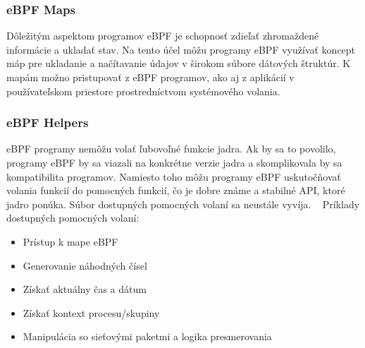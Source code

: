 \subsubsection{eBPF Maps}
Dôležitým aspektom programov eBPF je schopnosť zdieľať zhromaždené informácie a ukladať stav. 
Na tento účel môžu programy eBPF využívať koncept máp pre ukladanie a načítavanie údajov v širokom súbore dátových štruktúr.
K mapám možno pristupovať z eBPF programov, ako aj z aplikácií v používateľskom priestore prostredníctvom systémového volania.~\cite{eBPF, book1}

\subsubsection{eBPF Helpers}
eBPF programy nemôžu volať ľubovoľné funkcie jadra. Ak by sa to povolilo, programy eBPF by sa viazali na konkrétne verzie jadra 
a skomplikovala by sa kompatibilita programov. Namiesto toho môžu programy eBPF uskutočňovať volania funkcií do pomocných funkcií, 
čo je dobre známe a stabilné API, ktoré jadro ponúka. Súbor dostupných pomocných volaní sa neustále vyvíja. ~\cite{eBPF, book1}
Príklady dostupných pomocných volaní:
\begin{itemize}
    \item Prístup k mape eBPF
    \item Generovanie náhodných čísel
    \item Získať aktuálny čas a dátum
    \item Získať kontext procesu/skupiny
    \item Manipulácia so sieťovými paketmi a logika presmerovania
\end{itemize}

